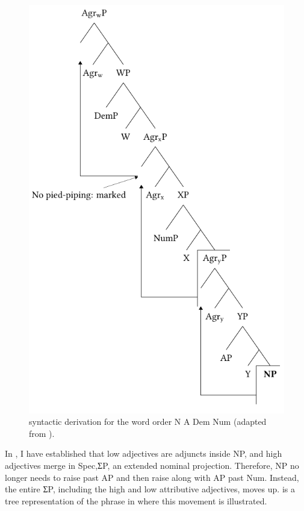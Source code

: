 \documentclass[output=paper]{langscibook}
\begin{document}
  
\begin{figure}
\includegraphics{figures/baron-img2.pdf}
\caption{syntactic derivation for the word order N A Dem Num (adapted from \citealt{Cinque2005}).} 
\label{fig:baron:2}
\end{figure}

In , I have established that low adjectives are adjuncts inside NP, and high adjectives merge in Spec,ƩP, an extended nominal projection. Therefore, NP no longer needs to raise past AP and then raise along with AP past Num. Instead, the entire ƩP, including the high and low attributive adjectives, moves up.  is a tree representation of the phrase in  where this movement is illustrated.
\end{document}
